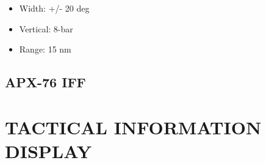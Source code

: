 \documentclass[fontInter]{TechCheck}
\begin{document}
\begin{longtableitemize}
{\begin{tableminipage}
\begin{itemize}
				\begin{itemize}
					\item Width: +/- 20 deg
					\item Vertical: 8-bar
					\item Range: 15 nm
				\end{itemize}
			\end{itemize}
		\end{tableminipage}}
	\end{longtableitemize}

	\subsection{APX-76 IFF}


	\cleardoublepage

	\section{TACTICAL INFORMATION DISPLAY}
\end{document}
